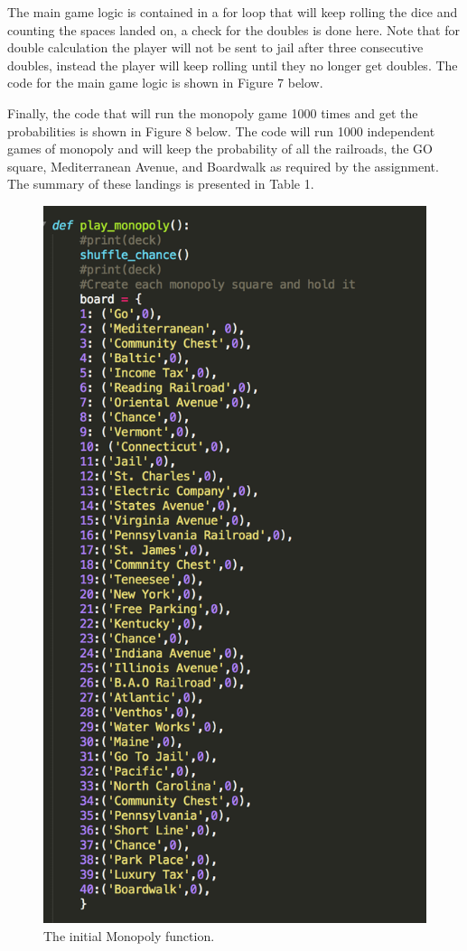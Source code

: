 \documentclass[12pt, letter]{article}
\begin{document}
The main game logic is contained in a for loop that will keep rolling the dice and counting the spaces landed on, a check for the doubles is done here. Note that for double calculation the player will not be sent to jail after three consecutive doubles, instead the player will keep rolling until they no longer get doubles. The code for the main game logic is shown in Figure 7 below. 

Finally, the code that will run the monopoly game 1000 times and get the probabilities is shown in Figure 8 below. The code will run 1000 independent games of monopoly and will keep the probability of all the railroads, the GO square, Mediterranean Avenue, and Boardwalk as required by the assignment. The summary of these landings is presented in Table 1. 

 \begin{figure}[htb]
  \centering
  \includegraphics[width=0.6 \textwidth]{./figures/monopoly_board.png}
  \caption{The initial Monopoly function.}
\end{figure}
\end{document}
